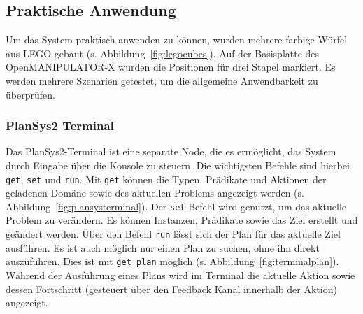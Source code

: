 \subsection{Praktische Anwendung}
Um das System praktisch anwenden zu können, wurden mehrere farbige Würfel aus LEGO gebaut (s. Abbildung~\ref{fig:legocubes}).
Auf der Basisplatte des OpenMANIPULATOR-X wurden die Positionen für drei Stapel markiert.
Es werden mehrere Szenarien getestet, um die allgemeine Anwendbarkeit zu überprüfen.
\subsubsection{PlanSys2 Terminal}
Das \ac{PlanSys2}-Terminal ist eine separate Node, die es ermöglicht, das System durch Eingabe über die Konsole zu steuern.
Die wichtigsten Befehle sind hierbei \verb|get|, \verb|set| und \verb|run|.
Mit \verb|get| können die Typen, Prädikate und Aktionen der geladenen Domäne sowie des aktuellen Problems angezeigt werden (s. Abbildung~\ref{fig:plansysterminal}).
Der \verb|set|-Befehl wird genutzt, um das aktuelle Problem zu verändern.
Es können Instanzen, Prädikate sowie das Ziel erstellt und geändert werden.
Über den Befehl \verb|run| lässt sich der Plan für das aktuelle Ziel ausführen.
Es ist auch möglich nur einen Plan zu suchen, ohne ihn direkt auszuführen.
Dies ist mit \verb|get plan| möglich (s. Abbildung~\ref{fig:terminalplan}).\\
Während der Ausführung eines Plans wird im Terminal die aktuelle Aktion sowie dessen Fortschritt (gesteuert über den Feedback Kanal innerhalb der Aktion) angezeigt.
